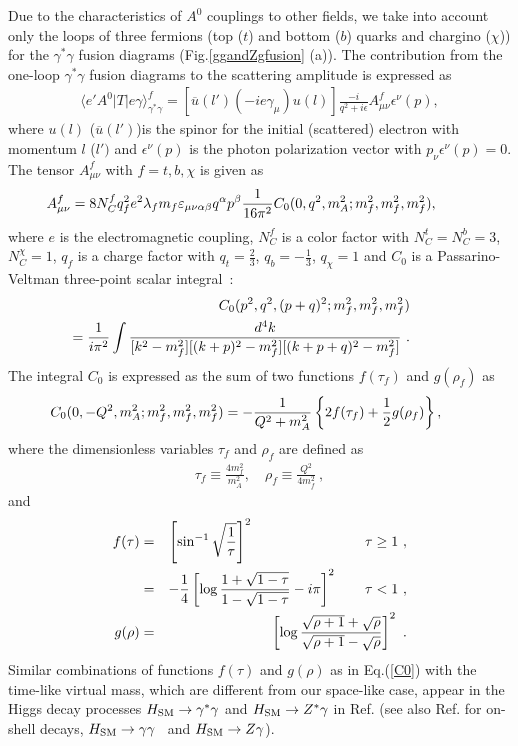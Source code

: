 \documentclass[final,5p,times,twocolumn]{elsarticle}
\newcommand{\bea}{\begin{eqnarray}}
\newcommand{\eea}{\end{eqnarray}}
\begin{document}
Due to the characteristics of $A^0$ couplings to other fields, we take into account  only 
the loops of three fermions (top ($t$) and bottom ($b$) quarks and chargino ($\chi$))  for the $\gamma^*\gamma$ fusion diagrams (Fig.\ref{ggandZgfusion} (a)). 
The contribution from the one-loop $\gamma^*\gamma$ fusion diagrams to the scattering amplitude is expressed  as
\bea
\langle e' A^0|T|e\gamma\rangle_{\gamma^*\gamma}^f=
[\overline{u}(l')(-ie\gamma_\mu)u(l)]\frac{-i}{q^2+i\epsilon}A_{\mu\nu}^f\epsilon^\nu(p) ,\label{Contributiongammagamma}
\eea
where $u(l)$ 
($\overline{u}(l')$)is the spinor for the initial (scattered) electron
with momentum $l$ ($l')$ and $\epsilon^\nu(p)$ is the photon polarization vector with $p_\nu
\epsilon^\nu(p)=0$.
The tensor $A^f_{\mu\nu}$ with $f=t,b,\chi$ is given as
\bea
&&\hspace{-1.3cm}
A^f_{\mu\nu}=8N^f_C q_f^2e^2\lambda_f m_f\varepsilon_{\mu\nu\alpha\beta}q^\alpha 
p^\beta
 \frac{1}{16\pi^2}C_0(0,q^2,m_A^2; m_f^2,m_f^2,m_f^2),\nonumber\\
\label{Amunu}
\eea
where $e$ is the electromagnetic coupling, $N_C^f$ is a color factor with $N^t_C=N_C^b=3$,  $N^\chi_C=1$, $q_f$ is a charge factor with $q_t=\frac{2}{3}$, $q_b=-\frac{1}{3}$, $q_\chi=1$ and $C_0$ is a Passarino-Veltman three-point scalar integral~\cite{PassarinoVeltman}:
\bea
&&\hspace{-1.3cm}C_0(p^2,q^2,(p+q)^2; m_f^2,m_f^2,m_f^2)\nonumber \\
&&\hspace{-1.3cm}=\frac{1}{i\pi^2}\int 
\frac{d^4k}{[k^2-m_f^2][(k+p)^2-m_f^2][(k+p+q)^2-m_f^2]}~.
\eea
The integral $C_0$ is expressed as the sum of two functions $f(\tau_f)$ and $g(\rho_f)$ as
\bea
\hspace{-0.7cm}C_0(0, -Q^2,m_A^2; m_f^2,m_f^2,m_f^2)
=-\frac{1}{Q^2+m_A^2}\left\{2f(\tau_f)+\frac{1}{2}g(\rho_f)\right\}, \label{C0}
\eea
where the dimensionless variables $\tau_f$ and $\rho_f$ are defined as
\bea
\tau_f\equiv \frac{4m_f^2}{m_A^2}, \quad \rho_f\equiv \frac{Q^2}{4m_f^2}~,
\eea
and 
\bea
f(\tau)&=&\left[\sin^{-1}\sqrt{\frac{1}{\tau}}\right]^2 \hspace{2.8cm} 
\tau\geq 1 \label{ftau-1}~,\\
&=&-\frac{1}{4}\left[\log{\frac{1+\sqrt{1-\tau}}{1-\sqrt{1-\tau}}}-i\pi
\right]^2 \qquad \tau<1\label{ftau-2}~,\\
g(\rho)&=&\left[\log\frac{\sqrt{\rho+1}+\sqrt{\rho}}
{\sqrt{\rho+1}-\sqrt{\rho}}\right]^2~.
\eea
Similar combinations of functions $f(\tau)$ and $g(\rho)$ as in Eq.(\ref{C0}) with the time-like virtual mass, 
which are different from our space-like case, appear in the Higgs decay processes $H_{\rm SM}\rightarrow \gamma^* \gamma$ and $H_{\rm SM}\rightarrow Z^* \gamma$  in Ref.\cite{RomaoAndringa1997} (see also Ref.\cite{Hunter} for on-shell decays, 
$H_{\rm SM}\rightarrow \gamma \gamma$~\cite{H2gammas} and $H_{\rm SM}\rightarrow Z \gamma$).
\end{document}
